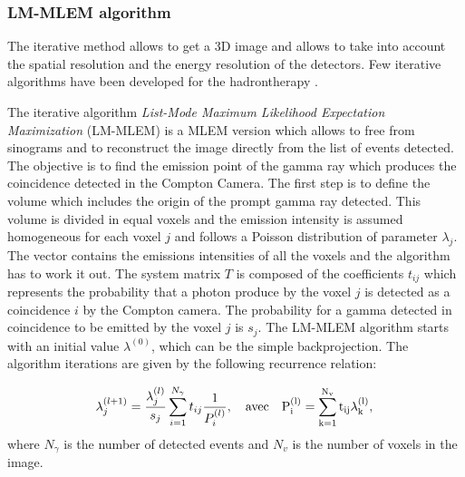 \subsubsection{LM-MLEM algorithm}	

The iterative method allows to get a 3D image and allows to take into account the spatial resolution and the energy resolution of the detectors. Few iterative algorithms have been developed for the hadrontherapy  \cite{schone_common_2010, zoglauer_design_2011,gillam_compton_2011,mackin_evaluation_2012,lojacono_low_2013}.

The iterative algorithm  \textit{List-Mode Maximum Likelihood Expectation Maximization} (LM-MLEM) is a MLEM version which allows to free from sinograms and to reconstruct the image directly from the list of events detected. \newline
The objective is to find the emission point of the gamma ray which produces the coincidence detected in the Compton Camera. 
The first step is to define the volume which includes the origin of the prompt gamma ray detected. This volume is divided in equal voxels and the emission intensity is assumed homogeneous for each voxel $j$ and follows a Poisson distribution of parameter $\lambda_j$. The vector contains the emissions intensities of all the voxels and the algorithm has to work it out. The system matrix $T$ is composed of the coefficients  $t_{ij}$ which represents the probability that a photon produce by the voxel $j$ is detected as a coincidence $i$ by the Compton camera. The probability for a gamma detected in coincidence to be emitted by the voxel $j$ is $s_j$.
The LM-MLEM algorithm starts with an initial value $\lambda^{(0)}$, which can be the simple backprojection.
The algorithm iterations are given by the following recurrence relation:

\begin{equation}
\lambda_j^{(l+1)} =  \frac{\lambda_j^{(l)} }{s_j} \sum\limits_{i=1}^{N_{\gamma}} t_{ij} \frac{1}{P_i^{(l)}},\quad \rm{avec}\quad  P_i^{(l)}=\sum\limits_{k=1}^{N_{v}} t_{ij}\lambda_k^{(l)},
 \label{eq:equation_lambda_compton_med_nucleaire}\newline
\end{equation}
where $N_{\gamma}$ is the number of detected events and $N_v$ is the number of voxels in the image.\newline

